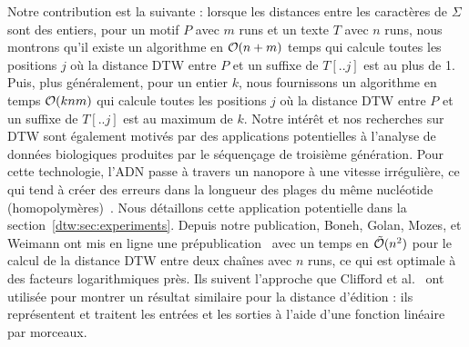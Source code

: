 Notre contribution est la suivante : lorsque les distances entre les caractères de $\Sigma$ sont des entiers, pour un motif $P$ avec $m$ runs et un texte $T$ avec $n$ runs, nous montrons qu'il existe un algorithme en $\mathcal{O}(n+m)$ temps qui calcule toutes les positions $j$ où la distance DTW entre $P$ et un suffixe de $T[..j]$ est au plus de 1. Puis, plus généralement, pour un entier $k$, nous fournissons un algorithme en temps $\mathcal{O}(knm)$ qui calcule toutes les positions $j$ où la distance DTW entre $P$ et un suffixe de $T[..j]$ est au maximum de $k$.
Notre intérêt et nos recherches sur DTW sont également motivés par des applications potentielles à l'analyse de données biologiques produites par le séquençage de troisième génération. Pour cette technologie, l'ADN passe à travers un nanopore à une vitesse irrégulière, ce qui tend à créer des erreurs dans la longueur des plages du même nucléotide (homopolymères)~\cite{delahaye2021sequencing}. Nous détaillons cette application potentielle dans la section~\ref{dtw:sec:experiments}.
Depuis notre publication, Boneh, Golan, Mozes, et Weimann ont mis en ligne une prépublication~\cite{boneh2023near} avec un temps en $\tilde{\mathcal{O}}(n^2)$ pour le calcul de la distance DTW entre deux chaînes avec $n$ runs, ce qui est optimale à des facteurs logarithmiques près. Ils suivent l'approche que Clifford et al.~\cite{clifford2019rle} ont utilisée pour montrer un résultat similaire pour la distance d'édition : ils représentent et traitent les entrées et les sorties à l'aide d'une fonction linéaire par morceaux.\\

